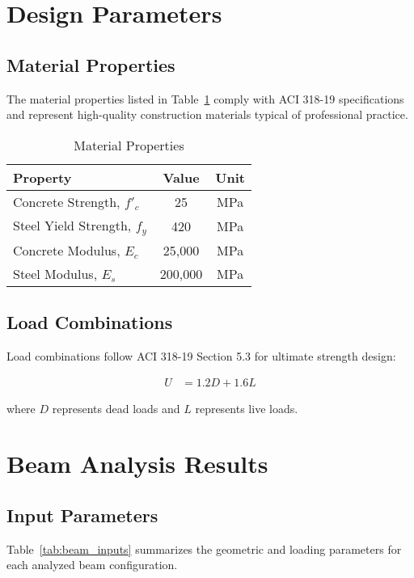 \documentclass[
  10pt,
  letterpaper,
  twocolumn
]{article}
\begin{document}
\section{Design Parameters}

\subsection{Material Properties}

The material properties listed in Table~\ref{tab:materials} comply with ACI 318-19 specifications and represent high-quality construction materials typical of professional practice.

\begin{table}[h]
\centering
\caption{Material Properties}
\label{tab:materials}
\begin{tabular}{@{}lcc@{}}
\toprule
\textbf{Property} & \textbf{Value} & \textbf{Unit} \\
\midrule
Concrete Strength, $f'_c$ & 25 & MPa \\
Steel Yield Strength, $f_y$ & 420 & MPa \\
Concrete Modulus, $E_c$ & 25,000 & MPa \\
Steel Modulus, $E_s$ & 200,000 & MPa \\
\bottomrule
\end{tabular}
\end{table}

\subsection{Load Combinations}

Load combinations follow ACI 318-19 Section 5.3 for ultimate strength design:

\begin{align}
U &= 1.2D + 1.6L \label{eq:load_combo}
\end{align}

where $D$ represents dead loads and $L$ represents live loads.

\section{Beam Analysis Results}

\subsection{Input Parameters}

Table~\ref{tab:beam_inputs} summarizes the geometric and loading parameters for each analyzed beam configuration.
\end{document}

